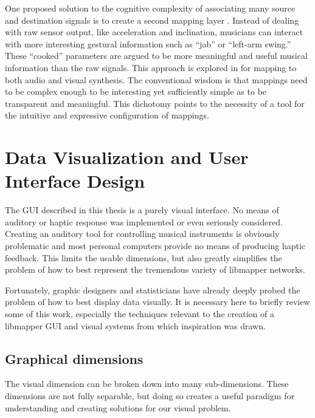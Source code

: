 One proposed solution to the cognitive complexity of associating many source and destination signals is to create a second mapping layer . Instead of dealing with raw sensor output, like acceleration and inclination, musicians can interact with more interesting gestural information such as ``jab'' or ``left-arm swing.'' These ``cooked'' parameters are argued to be more meaningful and useful musical information than the raw signals. This approach is explored in  for mapping to both audio and visual synthesis. The conventional wisdom is that mappings need to be complex enough to be interesting yet sufficiently simple as to be transparent and meaningful. This dichotomy points to the necessity of a tool for the intuitive and expressive configuration of mappings.


\section{Data Visualization and User Interface Design}
\label{sec:data_viz}

The GUI described in this thesis is a purely visual interface. No means of auditory or haptic response was implemented or even seriously considered. Creating an auditory tool for controlling musical instruments is obviously problematic and most personal computers provide no means of producing haptic feedback. This limits the usable dimensions, but also greatly simplifies the problem of how to best represent the tremendous variety of libmapper networks.

Fortunately, graphic designers and statisticians have already deeply probed the problem of how to best display data visually. It is necessary here to briefly review some of this work, especially the techniques relevant to the creation of a libmapper GUI and visual systems from which inspiration was drawn.

\subsection{Graphical dimensions}

The visual dimension can be broken down into many sub-dimensions. These dimensions are not fully separable, but doing so creates a useful paradigm for understanding and creating solutions for our visual problem. 

